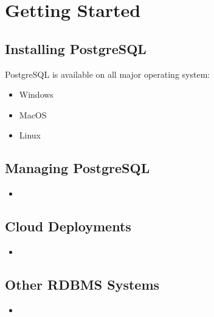 %
%
%
\section{Getting Started}

\subsection{Installing PostgreSQL}
PostgreSQL is available on all major operating system:

\begin{itemize}
    \item Windows
    \item MacOS
    \item Linux
\end{itemize}

\subsection{Managing PostgreSQL}

\begin{itemize}
    \item 
\end{itemize}


\subsection{Cloud Deployments}

\begin{itemize}
    \item 
\end{itemize}

\subsection{Other RDBMS Systems}

\begin{itemize}
    \item 
\end{itemize}
